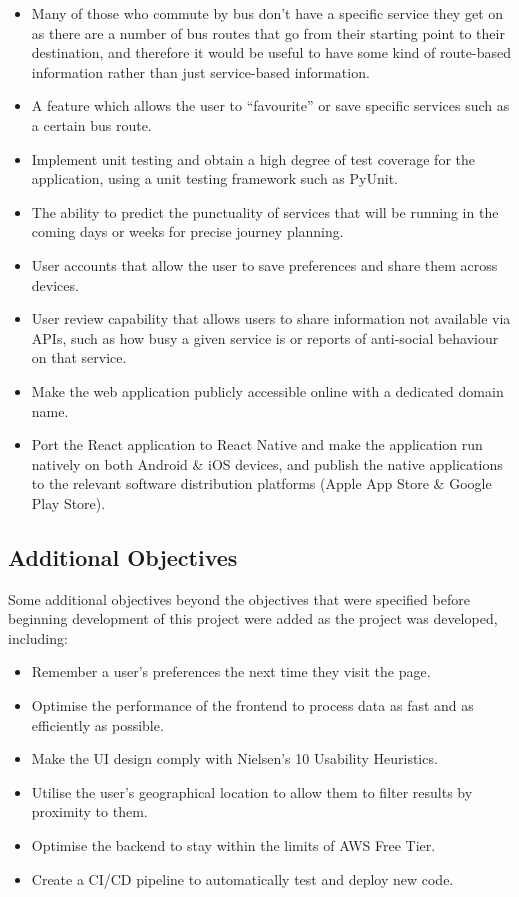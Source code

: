 \documentclass[a4paper,11pt]{report}
\begin{document}
\begin{itemize}
    \item   Many of those who commute by bus don't have a specific service they get on as there are a number of bus routes that go from their starting point to their destination, and therefore it would be useful to have some kind of route-based information rather than just service-based information. 
    \item   A feature which allows the user to ``favourite'' or save specific services such as a certain bus route.
    \item   Implement unit testing and obtain a high degree of test coverage for the application, using a unit testing framework such as PyUnit\supercite{pyunit}.
    \item   The ability to predict the punctuality of services that will be running in the coming days or weeks for precise journey planning.
    \item   User accounts that allow the user to save preferences and share them across devices.
    \item   User review capability that allows users to share information not available via APIs, such as how busy a given service is or reports of anti-social behaviour on that service.
    \item   Make the web application publicly accessible online with a dedicated domain name.
    \item   Port the React\supercite{react} application to React Native\supercite{native} and make the application run natively on both Android \& iOS devices, and publish the native applications to the relevant software distribution platforms (Apple App Store \& Google Play Store).
\end{itemize}

\subsection{Additional Objectives}
Some additional objectives beyond the objectives that were specified before beginning development of this project were added as the project was developed, including:
\begin{itemize}
    \item   Remember a user's preferences the next time they visit the page.
    \item   Optimise the performance of the frontend to process data as fast and as efficiently as possible.
    \item   Make the UI design comply with Nielsen's 10 Usability Heuristics\supercite{nielsenheuristics}.
    \item   Utilise the user's geographical location to allow them to filter results by proximity to them.
    \item   Optimise the backend to stay within the limits of AWS Free Tier\supercite{awsfree}.
    \item   Create a CI/CD pipeline to automatically test and deploy new code.
\end{itemize}
\end{document}

